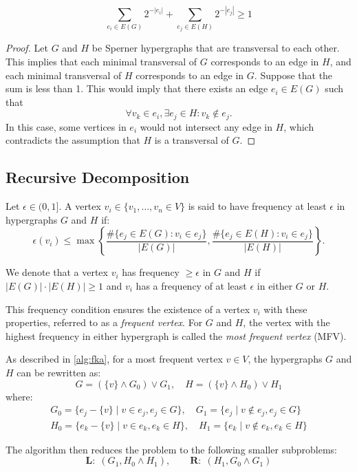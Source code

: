 \begin{proposition}\label{prop:sum}
\[
\sum_{e_i\in E(G)}2^{-|e_i|}+\sum_{e_j\in E(H)}2^{-|e_j|}\geq 1
\]
\end{proposition}

\begin{proof}
Let $G$ and $H$ be Sperner hypergraphs that are transversal to each other. This implies that each minimal transversal of $G$ corresponds to an edge in $H$, and each minimal transversal of $H$ corresponds to an edge in $G$. Suppose that the sum is less than 1. This would imply that there exists an edge $e_i\in E(G)$ such that
\[
\forall v_k\in e_i,\exists e_j\in H:v_k\notin e_j.
\]
In this case, some vertices in $e_i$ would not intersect any edge in $H$, which contradicts the assumption that $H$ is a transversal of $G$.
\end{proof}

\subsection{Recursive Decomposition}

Let $\epsilon\in(0,1]$. A vertex $v_i\in\{v_1,\dots,v_n\in V\}$ is said to have frequency at least $\epsilon$ in hypergraphs $G$ and $H$ if:
\[
\epsilon(v_i)\leq\max\left\{\frac{\#\{e_j\in E(G):v_i\in e_j\}}{|E(G)|},\frac{\#\{e_j\in E(H):v_i\in e_j\}}{|E(H)|}\right\}.
\]

We denote that a vertex $v_i$ has frequency $\geq\epsilon$ in $G$ and $H$ if $|E(G)|\cdot|E(H)|\geq 1$ and $v_i$ has a frequency of at least $\epsilon$ in either $G$ or $H$.

This frequency condition ensures the existence of a vertex $v_i$ with these properties, referred to as a \emph{frequent vertex}. For $G$ and $H$, the vertex with the highest frequency in either hypergraph is called the \emph{most frequent vertex} (MFV).

As described in \ref{alg:fka}, for a most frequent vertex $v\in V$, the hypergraphs $G$ and $H$ can be rewritten as:
\[
G=(\{v\}\wedge G_0)\vee G_1,\quad H=(\{v\}\wedge H_0)\vee H_1
\]
where:
\begin{gather*}
G_0=\{e_j-\{v\}\mid v\in e_j,e_j\in G\},\quad G_1=\{e_j\mid v\notin e_j,e_j\in G\}\\
H_0=\{e_k-\{v\}\mid v\in e_k,e_k\in H\},\quad H_1=\{e_k\mid v\notin e_k,e_k\in H\}
\end{gather*}

The algorithm then reduces the problem to the following smaller subproblems:
\[
\textbf{L:}\ \ (G_1,H_0\wedge H_1),\qquad\textbf{R:}\ \ (H_1,G_0\wedge G_1)
\]

